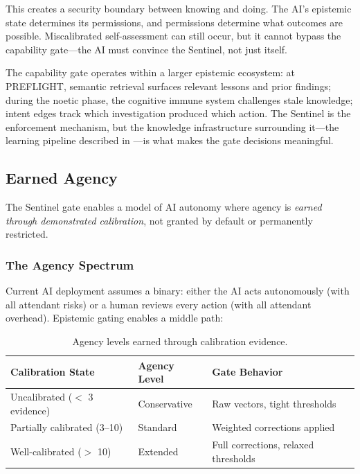This creates a security boundary between knowing and doing. The AI's epistemic state determines its permissions, and permissions determine what outcomes are possible. Miscalibrated self-assessment can still occur, but it cannot bypass the capability gate---the AI must convince the Sentinel, not just itself.

The capability gate operates within a larger epistemic ecosystem: at PREFLIGHT, semantic retrieval surfaces relevant lessons and prior findings; during the noetic phase, the cognitive immune system challenges stale knowledge; intent edges track which investigation produced which action. The Sentinel is the enforcement mechanism, but the knowledge infrastructure surrounding it---the learning pipeline described in ---is what makes the gate decisions meaningful.

\subsection{Earned Agency}

The Sentinel gate enables a model of AI autonomy where agency is \emph{earned through demonstrated calibration}, not granted by default or permanently restricted.

\subsubsection{The Agency Spectrum}

Current AI deployment assumes a binary: either the AI acts autonomously (with all attendant risks) or a human reviews every action (with all attendant overhead). Epistemic gating enables a middle path:

\begin{table}[h]
\centering
\begin{tabular}{lll}
\toprule
\textbf{Calibration State} & \textbf{Agency Level} & \textbf{Gate Behavior} \\
\midrule
Uncalibrated ($<$ 3 evidence) & Conservative & Raw vectors, tight thresholds \\
Partially calibrated (3--10) & Standard & Weighted corrections applied \\
Well-calibrated ($>$ 10) & Extended & Full corrections, relaxed thresholds \\
\bottomrule
\end{tabular}
\caption{Agency levels earned through calibration evidence.}
\label{tab:earned-agency}
\end{table}

